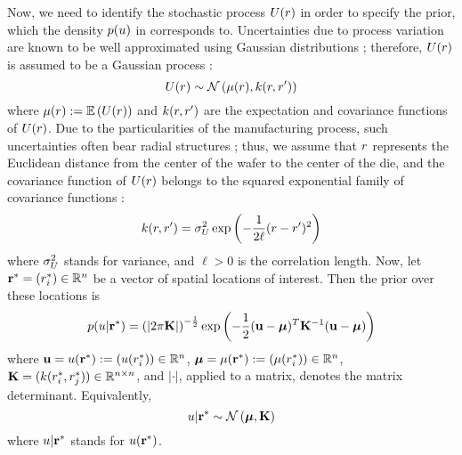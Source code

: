 Now, we need to identify the stochastic process $U(r)$ in order to specify the prior, which the density $\f{\u}$ in  corresponds to. Uncertainties due to process variation are known to be well approximated using Gaussian distributions \cite{srivastava2010}; therefore, $U(r)$ is assumed to be a Gaussian process \cite{rasmussen2006}:
\[
  \U(\r) \sim \gaussian{\fMean{\r}}{\fCov{\r, \r'}}
\]
where $\fMean{\r} := \E{\U(\r)}$ and $\fCov{\r, \r'}$ are the expectation and covariance functions of $U(r)$. Due to the particularities of the manufacturing process, such uncertainties often bear radial structures \cite{cheng2011}; thus, we assume that $r$ represents the Euclidean distance from the center of the wafer to the center of the die, and the covariance function of $U(r)$ belongs to the squared exponential family of covariance functions \cite{rasmussen2006}:
\begin{equation} \elabel{covariance-function}
  \fCov{\r, \r'} = \sigma^2_\U \exp\left(-\frac{1}{2 \ell}(\r - \r')^2\right)
\end{equation}
where $\sigma^2_U$ stands for variance, and $\ell > 0$ is the correlation length. Now, let $\mathbf{r}^* = (r^*_i) \in \mathbb{R}^n$ be a vector of spatial locations of interest. Then the prior over these locations is
\begin{equation} \elabel{prior}
  \f{\u | \vr^*} = \left(|2 \pi \mCov|\right)^{-\frac{1}{2}} \exp\left(-\frac{1}{2} (\vu - \vfMean)^T \mCov^{-1} (\vu - \vfMean) \right)
\end{equation}
where $\mathbf{u} = u(\mathbf{r}^*) := (u(r^*_i)) \in \mathbb{R}^n$, $\vfMean = \fMean{\vr^*} := (\fMean{\r^*_i}) \in \real^n$, $\mCov = (\fCov{\r^*_i, \r^*_j}) \in \real^{n \times n}$, and $|\cdot|$, applied to a matrix, denotes the matrix determinant. Equivalently,
\[
  u | \mathbf{r}^* \sim \mathcal{N}\left(\boldsymbol\mu, \mathbf{K}\right)
\]
where $u | \mathbf{r}^*$ stands for $u(\mathbf{r}^*)$.

